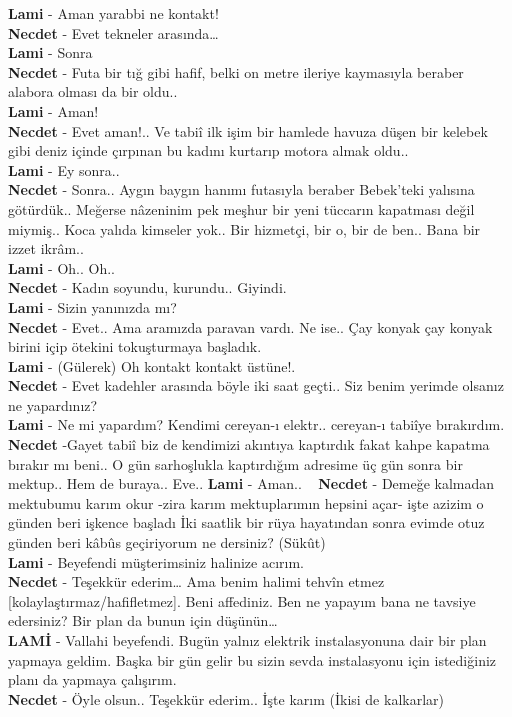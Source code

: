 \documentclass[]{book}
\begin{document}
\textbf{Lami} - Aman yarabbi ne kontakt!\\
\textbf{Necdet} - Evet tekneler arasında\ldots{}\\
\textbf{Lami} - Sonra\\
\textbf{Necdet} - Futa bir tığ gibi hafif, belki on metre ileriye kaymasıyla beraber alabora olması da bir oldu..\\
\textbf{Lami} - Aman!\\
\textbf{Necdet} - Evet aman!.. Ve tabiî ilk işim bir hamlede havuza düşen bir kelebek gibi deniz içinde çırpınan bu kadını kurtarıp motora almak oldu..\\
\textbf{Lami} - Ey sonra..\\
\textbf{Necdet} - Sonra.. Aygın baygın hanımı futasıyla beraber Bebek'teki yalısına götürdük.. Meğerse nâzeninim pek meşhur bir yeni tüccarın kapatması değil miymiş.. Koca yalıda kimseler yok.. Bir hizmetçi, bir o, bir de ben.. Bana bir izzet ikrâm..\\
\textbf{Lami} - Oh.. Oh..\\
\textbf{Necdet} - Kadın soyundu, kurundu.. Giyindi.\\
\textbf{Lami} - Sizin yanınızda mı?\\
\textbf{Necdet} - Evet.. Ama aramızda paravan vardı. Ne ise.. Çay konyak çay konyak birini içip ötekini tokuşturmaya başladık.\\
\textbf{Lami} - (Gülerek) Oh kontakt kontakt üstüne!.\\
\textbf{Necdet} - Evet kadehler arasında böyle iki saat geçti.. Siz benim yerimde olsanız ne yapardınız?\\
\textbf{Lami} - Ne mi yapardım? Kendimi cereyan-ı elektr.. cereyan-ı tabiîye bırakırdım.\\
\textbf{Necdet} -Gayet tabiî biz de kendimizi akıntıya kaptırdık fakat kahpe kapatma bırakır mı beni.. O gün sarhoşlukla kaptırdığım adresime üç gün sonra bir mektup.. Hem de buraya.. Eve..
\textbf{Lami} - Aman.. ~
\textbf{Necdet} - Demeğe kalmadan mektubumu karım okur -zira karım mektuplarımın hepsini açar- işte azizim o günden beri işkence başladı İki saatlik bir rüya hayatından sonra evimde otuz günden beri kâbûs geçiriyorum ne dersiniz? (Sükût)\\
\textbf{Lami} - Beyefendi müşterimsiniz halinize acırım.\\
\textbf{Necdet} - Teşekkür ederim\ldots{} Ama benim halimi tehvîn etmez {[}kolaylaştırmaz/hafifletmez{]}. Beni affediniz. Ben ne yapayım bana ne tavsiye edersiniz? Bir plan da bunun için düşünün\ldots{} ~\\
\textbf{LAMİ} - Vallahi beyefendi. Bugün yalnız elektrik instalasyonuna dair bir plan yapmaya geldim. Başka bir gün gelir bu sizin sevda instalasyonu için istediğiniz planı da yapmaya çalışırım.\\
\textbf{Necdet} - Öyle olsun.. Teşekkür ederim.. İşte karım (İkisi de kalkarlar)\\
\end{document}
